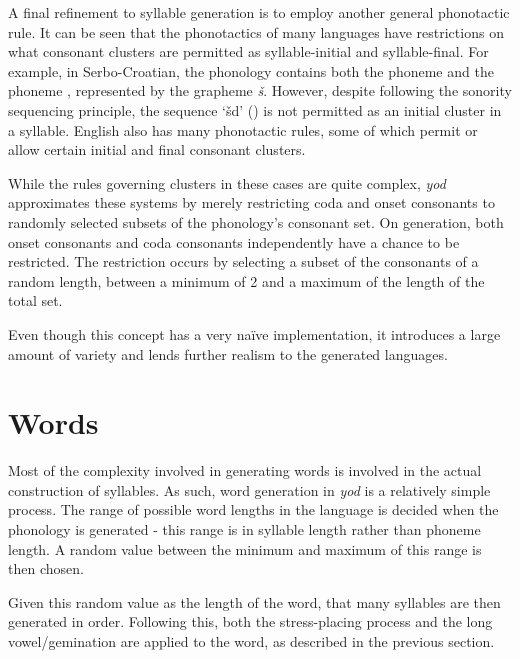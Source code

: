 \documentclass{report}
\begin{document}
	A final refinement to syllable generation is to employ another general phonotactic rule. It can be seen that the phonotactics of many languages have restrictions on what consonant clusters are permitted as syllable-initial and syllable-final. For example, in Serbo-Croatian, the phonology contains both the phoneme  and the phoneme , represented by the grapheme \textit{\v{s}}. However, despite following the sonority sequencing principle, the sequence `\v{s}d' () is not permitted as an initial cluster in a syllable\cite{uzelac1971phonological}. English also has many phonotactic rules, some of which permit or allow certain initial and final consonant clusters\cite{chomsky1968sound}.
	
	While the rules governing clusters in these cases are quite complex, \textit{yod} approximates these systems by merely restricting coda and onset consonants to randomly selected subsets of the phonology's consonant set. On generation, both onset consonants and coda consonants independently have a chance to be restricted. The restriction occurs by selecting a subset of the consonants of a random length, between a minimum of 2 and a maximum of the length of the total set.
	
	Even though this concept has a very na\"{i}ve implementation, it introduces a large amount of variety and lends further realism to the generated languages.
	
	\section{Words}
	\label{section: words}
	
	Most of the complexity involved in generating words is involved in the actual construction of syllables. As such, word generation in \textit{yod} is a relatively simple process. The range of possible word lengths in the language is decided when the phonology is generated - this range is in syllable length rather than phoneme length. A random value between the minimum and maximum of this range is then chosen.
	
	Given this random value as the length of the word, that many syllables are then generated in order. Following this, both the stress-placing process and the long vowel/gemination are applied to the word, as described in the previous section. 
	
\end{document}
